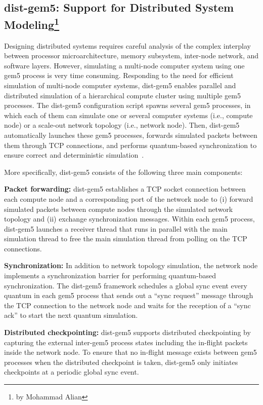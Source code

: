\subsection[dist-gem5: Support for Distributed System Modeling]{dist-gem5: Support for Distributed System Modeling\footnote{by Mohammad Alian}}
\label{sec:dist-gem5}

Designing distributed systems requires careful analysis of the complex interplay between processor
microarchitecture, memory subsystem, inter-node network, and software layers.
However, simulating a multi-node computer system using one gem5 process is very time consuming.
Responding to the need for efficient simulation of multi-node computer systems, dist-gem5 enables parallel and distributed simulation of a hierarchical compute cluster using multiple gem5 processes.
The dist-gem5 configuration script spawns several gem5 processes, in which each of them can simulate one or several computer systems (i.e., compute node) or a scale-out network topology (i.e., network node).
Then, dist-gem5 automatically launches these gem5 processes, forwards simulated packets between them through TCP connections, and performs quantum-based synchronization to ensure correct and deterministic simulation~\cite{AlianDarbaz2016-gem5Dist, AlianKim2016-pd-gem5}.

More specifically, dist-gem5 consists of the following three main components:

\textbf{Packet forwarding:} dist-gem5 establishes a TCP socket connection between each compute node and a corresponding port of the network node to (i) forward simulated packets between compute nodes
through the simulated network topology and (ii) exchange synchronization messages.
Within each gem5 process, dist-gem5 launches a receiver thread that runs in parallel with the main simulation thread to free the main simulation thread from polling on the TCP connections.

\textbf{Synchronization:} In addition to network topology simulation, the network node implements a
synchronization barrier for performing quantum-based synchronization.
The dist-gem5 framework schedules a global sync event every quantum in each gem5 process that sends out a ``sync request'' message through the TCP connection to the network node
and waits for the reception of a ``sync ack'' to start the next quantum simulation.

\textbf{Distributed checkpointing:} dist-gem5 supports distributed checkpointing by capturing the external inter-gem5 process states including the in-flight packets inside the network node.
To ensure that no in-flight message exists between gem5 processes when the distributed checkpoint is taken, dist-gem5 only initiates checkpoints at a periodic global sync event.


